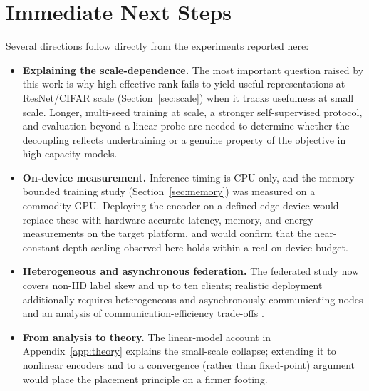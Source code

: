 \section{Immediate Next Steps}
Several directions follow directly from the experiments reported here:
\begin{itemize}
    \item \textbf{Explaining the scale-dependence.} The most important question
    raised by this work is why high effective rank fails to yield useful
    representations at ResNet/CIFAR scale (Section~\ref{sec:scale}) when it
    tracks usefulness at small scale. Longer, multi-seed training at scale, a
    stronger self-supervised protocol, and evaluation beyond a linear probe are
    needed to determine whether the decoupling reflects undertraining or a
    genuine property of the objective in high-capacity models.
    \item \textbf{On-device measurement.} Inference timing is CPU-only, and the
    memory-bounded training study (Section~\ref{sec:memory}) was measured on a
    commodity GPU. Deploying the encoder on a defined edge device would replace
    these with hardware-accurate latency, memory, and energy measurements on the
    target platform, and would confirm that the near-constant depth scaling
    observed here holds within a real on-device budget.
    \item \textbf{Heterogeneous and asynchronous federation.} The federated
    study now covers non-IID label skew and up to ten clients; realistic
    deployment additionally requires heterogeneous and asynchronously
    communicating nodes and an analysis of communication-efficiency trade-offs
    \cite{mcmahan2017communication}.
    \item \textbf{From analysis to theory.} The linear-model account in
    Appendix~\ref{app:theory} explains the small-scale collapse; extending it
    to nonlinear encoders and to a convergence (rather than fixed-point)
    argument would place the placement principle on a firmer footing.
\end{itemize}

